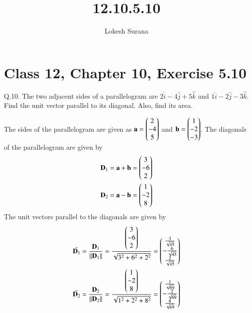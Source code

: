 \documentclass[journal,12pt,twocolumn]{IEEEtran}
\renewcommand{\vec}[1]{\boldsymbol{\mathbf{#1}}}
\begin{document}
\vspace{3cm}
\title{12.10.5.10}
\author{Lokesh Surana}
\maketitle
\section*{Class 12, Chapter 10, Exercise 5.10}

Q.10. The two adjacent sides of a parallelogram are  ${2}\hat{i} -  {4}\hat{j} + {5}\hat{k}$ and ${1}\hat{i} -  {2}\hat{j} - {3}\hat{k}$.
Find the unit vector parallel to its diagonal. Also, find its area.

\solution The sides of the parallelogram are given as $\vec{a} = \myvec{2\\-4\\5}$ and $\vec{b} = \myvec{1\\-2\\-3}$.
\break
The diagonals of the parallelogram are given by
\begin{align}
    \vec{D}_1 = \vec{a} + \vec{b} = \myvec{3 \\-6\\2} \\
    \vec{D}_2 = \vec{a} - \vec{b} = \myvec{1 \\-2\\8}
\end{align}
The unit vectors parallel to the diagonals are given by
\begin{align}
    \hat{\vec{D}_1} = \frac{\vec{D}_1}{\norm{\vec{D}_1}} = \frac{\myvec{3 \\-6\\2}}{\sqrt{3^2 + 6^2 + 2^2}} = \myvec{\frac{3}{\sqrt{45}}\\-\frac{6}{\sqrt{45}}\\\frac{2}{\sqrt{45}}} \\
    \hat{\vec{D}_2} = \frac{\vec{D}_2}{\norm{\vec{D}_2}} = \frac{\myvec{1 \\-2\\8}}{\sqrt{1^2 + 2^2 + 8^2}} = \myvec{\frac{1}{\sqrt{69}}\\-\frac{2}{\sqrt{69}}\\\frac{8}{\sqrt{69}}}
\end{align}
\end{document}
